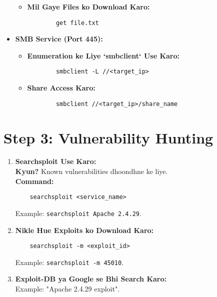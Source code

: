 \documentclass[a4paper]{article}
\begin{document}
\begin{itemize}
\begin{itemize}
      \item \textbf{Mil Gaye Files ko Download Karo:} \\
        \begin{lstlisting}
        get file.txt  
        \end{lstlisting}
    \end{itemize}
  \item \textbf{SMB Service (Port 445):}
    \begin{itemize}
      \item \textbf{Enumeration ke Liye `smbclient` Use Karo:} \\
        \begin{lstlisting}
        smbclient -L //<target_ip>  
        \end{lstlisting}
      \item \textbf{Share Access Karo:} \\
        \begin{lstlisting}
        smbclient //<target_ip>/share_name  
        \end{lstlisting}
    \end{itemize}
\end{itemize}

\section{Step 3: Vulnerability Hunting}
\begin{enumerate}
  \item \textbf{Searchsploit Use Karo:} \\
    \textbf{Kyun?} Known vulnerabilities dhoondhne ke liye. \\
    \textbf{Command:} \\
    \begin{lstlisting}
    searchsploit <service_name>  
    \end{lstlisting}
    Example: \texttt{searchsploit Apache 2.4.29}.
  \item \textbf{Nikle Hue Exploits ko Download Karo:} \\
    \begin{lstlisting}
    searchsploit -m <exploit_id>  
    \end{lstlisting}
    Example: \texttt{searchsploit -m 45010}.
  \item \textbf{Exploit-DB ya Google se Bhi Search Karo:} \\
    Example: "Apache 2.4.29 exploit".
\end{enumerate}
\end{document}
